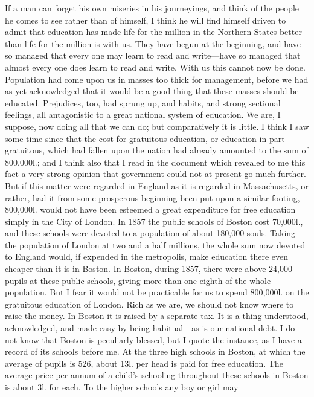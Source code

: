 If a man can forget his own miseries in his journeyings, and think
of the people he comes to see rather than of himself, I think he
will find himself driven to admit that education has made life for
the million in the Northern States better than life for the million
is with us.  They have begun at the beginning, and have so managed
that every one may learn to read and write---have so managed that
almost every one does learn to read and write.  With us this cannot
now be done.  Population had come upon us in masses too thick for
management, before we had as yet acknowledged that it would be a
good thing that these masses should be educated.  Prejudices, too,
had sprung up, and habits, and strong sectional feelings, all
antagonistic to a great national system of education.  We are, I
suppose, now doing all that we can do; but comparatively it is
little.  I think I saw some time since that the cost for gratuitous
education, or education in part gratuitous, which had fallen upon
the nation had already amounted to the sum of 800,000l.; and I
think also that I read in the document which revealed to me this
fact a very strong opinion that government could not at present go
much further.  But if this matter were regarded in England as it is
regarded in Massachusetts, or rather, had it from some prosperous
beginning been put upon a similar footing, 800,000l. would not have
been esteemed a great expenditure for free education simply in the
City of London.  In 1857 the public schools of Boston cost
70,000l., and these schools were devoted to a population of about
180,000 souls.  Taking the population of London at two and a half
millions, the whole sum now devoted to England would, if expended
in the metropolis, make education there even cheaper than it is in
Boston.  In Boston, during 1857, there were above 24,000 pupils at
these public schools, giving more than one-eighth of the whole
population.  But I fear it would not be practicable for us to spend
800,000l. on the gratuitous education of London.  Rich as we are,
we should not know where to raise the money.  In Boston it is
raised by a separate tax.  It is a thing understood, acknowledged,
and made easy by being habitual---as is our national debt.  I do not
know that Boston is peculiarly blessed, but I quote the instance,
as I have a record of its schools before me.  At the three high
schools in Boston, at which the average of pupils is 526, about
13l. per head is paid for free education.  The average price per
annum of a child's schooling throughout these schools in Boston is
about 3l. for each.  To the higher schools any boy or girl may
